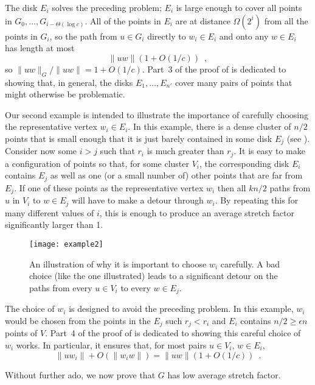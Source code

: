 \documentclass{patmorin}
\begin{document}
The disk $E_i$ solves the preceding problem; $E_i$ is large enough to
cover all points in $G_0,\ldots,G_{i-\Theta(\log c)}$.  All of the points
in $E_i$ are at distance $\Omega(2^i)$ from all the points in $G_i$,
so the path from $u\in G_i$ directly to $w_i\in E_i$ and onto any $w\in
E_i$ has length at most
\[
    \|uw\|(1+O(1/c)) \enspace ,
\]
so $\|uw\|_G/\|uw\| = 1+O(1/c)$.  Part~3 of the proof of
 is dedicated to showing that, in general, the disks
$E_1,\ldots,E_{n'}$ cover many pairs of points that might otherwise
be problematic.

Our second example is intended to illustrate the importance of carefully
choosing the representative vertex $w_i\in E_i$.   In this example,
there is a dense cluster of $n/2$ points that is small enough that it
is just barely contained in some disk $E_j$ (see ).
Consider now some $i>j$ such that $r_i$ is much greater than $r_j$.
It is easy to make a configuration of points so that, for some cluster
$V_i$, the corresponding disk $E_i$ contains $E_j$ as well as one (or a
small number of) other points that are far from $E_j$. If one of these
points as the representative vertex $w_i$ then all $kn/2$ paths from
$u$ in $V_i$ to $w\in E_j$ will have to make a detour through $w_i$.
By repeating this for many different values of $i$, this is enough to
produce an average stretch factor significantly larger than 1.

\begin{figure}
  \begin{center}
    \texttt{[image: example2]}
  \end{center}
  \caption{An illustration of why it is important to choose $w_i$ carefully.
    A bad choice (like the one illustrated) leads to a significant detour
    on the paths from every $u\in V_i$ to every $w\in E_j$.}
\end{figure}




The choice of $w_i$ is designed to avoid the preceding problem.  In this
example, $w_i$ would be chosen from the points in the $E_j$ such $r_j <
r_i$ and $E_i$ contains $n/2\ge \epsilon n$ points of $V$.  Part~4 of
the proof of  is dedicated to showing this careful
choice of $w_i$ works.  In particular, it ensures that, for most pairs
$u\in V_i$, $w\in E_i$,
\[
    \|uw_i\| + O(\|w_iw\|) = \|uw\|(1+O(1/c)) \enspace .
\]

Without further ado, we now prove that $G$ has low average stretch factor.
\end{document}
